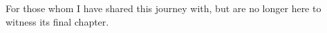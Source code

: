 %

\begin{ntdedicatory}

For those whom I have shared this journey with, but are no longer here to witness its final chapter.

\end{ntdedicatory}